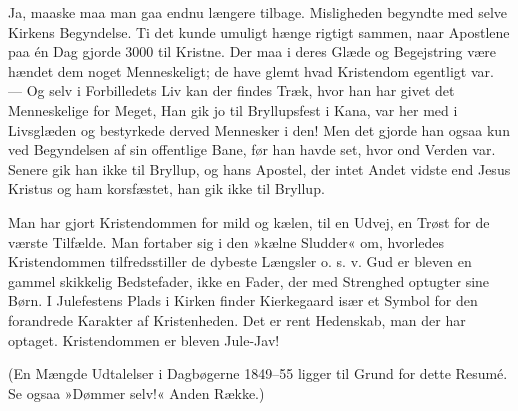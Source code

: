 \documentclass[12pt,a4paper,openany]{book}
\newcommand{\opage}[1]{\marginnote{\footnotesize\textit{[#1]}}}
\begin{document}
Ja, maaske maa man gaa endnu længere tilbage.
Misligheden begyndte med selve Kirkens Begyndelse. Ti
det kunde umuligt hænge rigtigt sammen, naar Apostlene
\opage{140}paa én Dag gjorde 3000 til Kristne. Der maa i deres
Glæde og Begejstring være hændet dem noget Menneskeligt;
de have glemt hvad Kristendom egentligt var. ---
Og selv i Forbilledets Liv kan der findes Træk, hvor
han har givet det Menneskelige for Meget, Han gik jo
til Bryllupsfest i Kana, var her med i Livsglæden og
bestyrkede derved Mennesker i den! Men det gjorde han
ogsaa kun ved Begyndelsen af sin offentlige Bane, før
han havde set, hvor ond Verden var. Senere gik han
ikke til Bryllup, og hans Apostel, der intet Andet vidste
end Jesus Kristus og ham korsfæstet, han gik ikke til
Bryllup.

Man har gjort Kristendommen for mild og kælen, til
en Udvej, en Trøst for de værste Tilfælde. Man fortaber
sig i den »kælne Sludder« om, hvorledes Kristendommen
tilfredsstiller de dybeste Længsler o. s. v. Gud
er bleven en gammel skikkelig Bedstefader, ikke en Fader,
der med Strenghed optugter sine Børn. I Julefestens
Plads i Kirken finder Kierkegaard især et Symbol for
den forandrede Karakter af Kristenheden. Det er rent
Hedenskab, man der har optaget. Kristendommen er
bleven Jule-Jav!

(En Mængde Udtalelser i Dagbøgerne 1849--55 ligger
til Grund for dette Resumé. Se ogsaa »Dømmer selv!«
Anden Række.)
\end{document}
